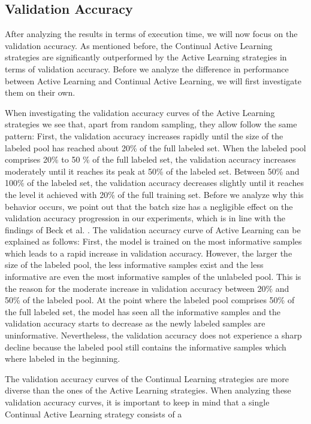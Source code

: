 \subsection{Validation Accuracy}
\label{sec:Discussion:ValidationAccuracy}
After analyzing the results in terms of execution time, we will now focus on the validation accuracy. As mentioned before, the Continual Active Learning strategies are significantly outperformed by the Active Learning strategies in terms of validation accuracy. Before we
analyze the difference in performance between Active Learning and Continual Active Learning, we will first investigate them on their own. \par
When investigating the validation accuracy curves of the Active Learning strategies we see that, apart from random sampling, they allow follow the same pattern: First, the validation accuracy increases rapidly until the size of the labeled pool has reached about 20\% of
the full labeled set. When the labeled pool comprises 20\% to 50 \% of the full labeled set, the validation accuracy increases moderately until it reaches its peak at 50\% of the labeled set. Between 50\% and 100\% of the labeled set, the validation accuracy
decreases slightly until it reaches the level it achieved with 20\% of the full training set. Before we analyze why this behavior occurs, we point out that the batch size has a negligible effect on the validation accuracy progression in our experiments, which is in line
with the findings of Beck et al. \cite{beck2021effective}. The validation accuracy curve of Active Learning can be explained as follows: First, the model is trained on the most informative samples which leads to a rapid increase in validation accuracy. However, the larger
the size of the labeled pool, the less informative samples exist and the less informative are even the most informative samples of the unlabeled pool. This is the reason for the moderate increase in validation accuracy between 20\% and 50\% of the labeled pool. At the point
where the labeled pool comprises 50\% of the full labeled set, the model has seen all the informative samples and the validation accuracy starts to decrease as the newly labeled samples are uninformative. Nevertheless, the validation accuracy does not experience a sharp decline
because the labeled pool still contains the informative samples which where labeled in the beginning. \par
The validation accuracy curves of the Continual Learning strategies are more diverse than the ones of the Active Learning strategies. When analyzing these validation accuracy curves, it is important to keep in mind that a single Continual Active Learning strategy consists of a
